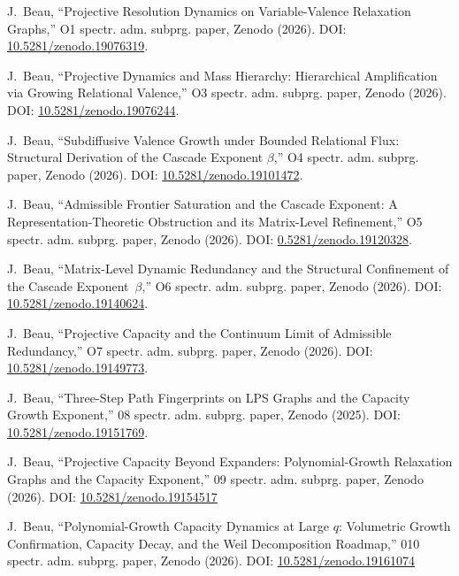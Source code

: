 J.~Beau,
``Projective Resolution Dynamics on Variable-Valence Relaxation Graphs,''
O1 spectr. adm. subprg. paper, Zenodo (2026).
DOI: \href{https://doi.org/10.5281/zenodo.19076319}{10.5281/zenodo.19076319}.

J.~Beau,
``Projective Dynamics and Mass Hierarchy: Hierarchical Amplification via Growing Relational Valence,''
O3 spectr. adm. subprg. paper, Zenodo (2026).
DOI: \href{https://doi.org/10.5281/zenodo.19076244}{10.5281/zenodo.19076244}.

J.~Beau,
``Subdiffusive Valence Growth under Bounded Relational Flux: Structural Derivation of the Cascade Exponent $\beta$,''
O4 spectr. adm. subprg. paper, Zenodo (2026).
DOI: \href{https://doi.org/10.5281/zenodo.19101472}{10.5281/zenodo.19101472}.

J.~Beau,
``Admissible Frontier Saturation and the Cascade Exponent: A Representation-Theoretic Obstruction and its Matrix-Level
Refinement,''
O5 spectr. adm. subprg. paper, Zenodo (2026).
DOI: \href{https://doi.org/10.5281/zenodo.19120328}{0.5281/zenodo.19120328}.

J.~Beau,
``Matrix-Level Dynamic Redundancy and the Structural Confinement of the Cascade Exponent~$\beta$,''
O6 spectr. adm. subprg. paper, Zenodo (2026).
DOI: \href{https://doi.org/10.5281/zenodo.19140624}{10.5281/zenodo.19140624}.

J.~Beau,
``Projective Capacity and the Continuum Limit of Admissible Redundancy,''
O7 spectr. adm. subprg. paper, Zenodo (2026).
DOI: \href{https://doi.org/10.5281/zenodo.19149773}{10.5281/zenodo.19149773}.

J.~Beau,
``Three-Step Path Fingerprints on LPS Graphs and the Capacity Growth Exponent,''
08 spectr. adm. subprg. paper, Zenodo (2025).
DOI: \href{https://doi.org/10.5281/zenodo.19151769}{10.5281/zenodo.19151769}.

J.~Beau,
``Projective Capacity Beyond Expanders: Polynomial-Growth Relaxation Graphs and the Capacity Exponent,''
09 spectr. adm. subprg. paper, Zenodo (2026).
DOI: \href{https://doi.org/10.5281/zenodo.19154517}{10.5281/zenodo.19154517}

J.~Beau,
``Polynomial-Growth Capacity Dynamics at Large $q$: Volumetric Growth Confirmation, Capacity Decay, and the Weil
Decomposition Roadmap,''
010 spectr. adm. subprg. paper, Zenodo (2026).
DOI: \href{https://doi.org/10.5281/zenodo.19161074}{10.5281/zenodo.19161074}


